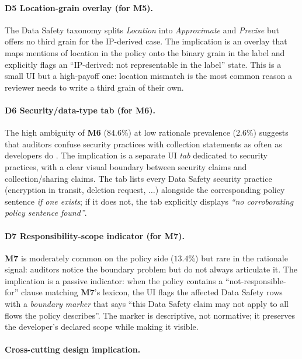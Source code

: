 \documentclass[11pt,a4paper]{article}
\newcommand{\code}[1]{\textsf{\textbf{#1}}}
\begin{document}
\paragraph{\textbf{D5} Location-grain overlay (for \code{M5}).}
The Data Safety taxonomy splits \textsl{Location} into
\textsl{Approximate} and \textsl{Precise} but offers no third grain
for the IP-derived case. The implication is an overlay that maps
mentions of location in the policy onto the binary grain in the
label and explicitly flags an ``IP-derived: not representable in the
label'' state. This is a small UI but a high-payoff one: location
mismatch is the most common reason a reviewer needs to write a third
grain of their own.

\paragraph{\textbf{D6} Security/data-type tab (for \code{M6}).}
The high ambiguity of \code{M6} ($84.6\%$) at low rationale
prevalence ($2.6\%$) suggests that auditors confuse security
practices with collection statements as often as developers do
\citep{khandelwal2024unpacking}. The implication is a separate UI
\emph{tab} dedicated to security practices, with a clear visual
boundary between security claims and collection/sharing claims. The
tab lists every Data Safety security practice (encryption in transit,
deletion request, $\dots$) alongside the corresponding policy
sentence \emph{if one exists}; if it does not, the tab explicitly
displays \emph{``no corroborating policy sentence found''}.

\paragraph{\textbf{D7} Responsibility-scope indicator (for \code{M7}).}
\code{M7} is moderately common on the policy side ($13.4\%$) but
rare in the rationale signal: auditors notice the boundary problem
but do not always articulate it. The implication is a passive
indicator: when the policy contains a ``not-responsible-for'' clause
matching \code{M7}'s lexicon, the UI flags the affected Data Safety
rows with a \emph{boundary marker} that says ``this Data Safety
claim may not apply to all flows the policy describes''. The
marker is descriptive, not normative; it preserves the developer's
declared scope while making it visible.

\paragraph{Cross-cutting design implication.}
\end{document}
